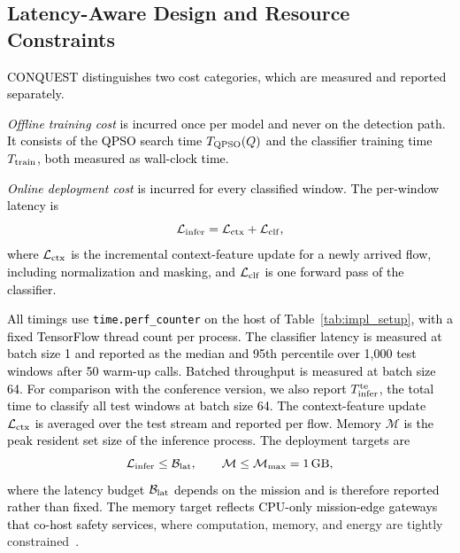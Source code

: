\documentclass[conference]{IEEEtran}
\begin{document}
\subsection{Latency-Aware Design and Resource Constraints}
\label{subsec:latency_design}
\textcolor{black}{CONQUEST distinguishes two cost
categories, which are measured and reported separately.}

\textcolor{black}{\textit{Offline training cost} is incurred
once per model and never on the detection path. It consists of the
QPSO search time $T_{\rm QPSO}(Q)$ and the classifier training time
$T_{\rm train}$, both measured as wall-clock time.}

\textcolor{black}{\textit{Online deployment cost} is incurred
for every classified window. The per-window latency is}
\begin{equation}
\textcolor{black}{\mathcal{L}_{\rm infer} =
\mathcal{L}_{\rm ctx} + \mathcal{L}_{\rm clf},}
\label{eq:latency_decomp}
\end{equation}
\textcolor{black}{where $\mathcal{L}_{\rm ctx}$ is the
incremental context-feature update for a newly arrived flow,
including normalization and masking, and $\mathcal{L}_{\rm clf}$ is
one forward pass of the classifier.}

\textcolor{black}{All timings use \texttt{time.perf\_counter}
on the host of Table~\ref{tab:impl_setup}, with a fixed TensorFlow
thread count per process. The classifier latency is measured at batch
size 1 and reported as the median and 95th percentile over 1{,}000
test windows after 50 warm-up calls. Batched throughput is measured
at batch size 64. For comparison with the conference version, we also
report $T_{\rm infer}^{\rm te}$, the total time to classify all test
windows at batch size 64. The context-feature update
$\mathcal{L}_{\rm ctx}$ is averaged over the test stream and reported
per flow. Memory $\mathcal{M}$ is the peak resident set size of the
inference process. The deployment targets are}
\begin{equation}
\textcolor{black}{\mathcal{L}_{\rm infer}\le\mathcal{B}_{\rm lat},
\qquad
\mathcal{M}\le\mathcal{M}_{\max}=1\,\text{GB},}
\label{eq:memory_constraint}
\end{equation}
\textcolor{black}{where the latency budget
$\mathcal{B}_{\rm lat}$ depends on the mission and is therefore
reported rather than fixed. The memory target reflects CPU-only
mission-edge gateways that co-host safety services}, where
computation, memory, and energy are tightly
constrained~\cite{amadi2026lightweight}.
\end{document}
